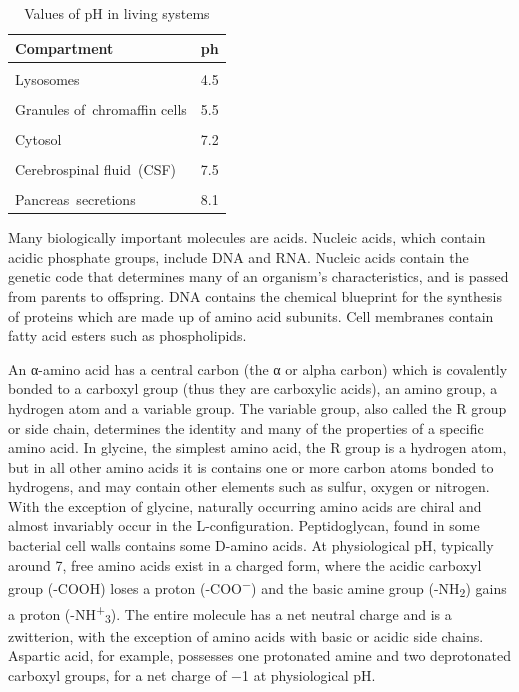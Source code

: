 \begin{table}[!h]

\caption{\label{tab:pH}Values of pH in living systems}
\centering
\begin{tabular}[t]{lc}
\toprule
Compartment & ph\\
\midrule
\cellcolor{gray!6}{Gastric acid} & \cellcolor{gray!6}{1.5-3.5}\\
Lysosomes & 4.5\\
\cellcolor{gray!6}{Human skin} & \cellcolor{gray!6}{4.7}\\
Granules of chromaffin cells & 5.5\\
\cellcolor{gray!6}{Urine} & \cellcolor{gray!6}{6}\\
\addlinespace
Cytosol & 7.2\\
\cellcolor{gray!6}{Blood (natural pH)} & \cellcolor{gray!6}{7.34–7.45}\\
Cerebrospinal fluid (CSF) & 7.5\\
\cellcolor{gray!6}{Mitochondrial matrix} & \cellcolor{gray!6}{7.5}\\
Pancreas secretions & 8.1\\
\bottomrule
\end{tabular}
\end{table}

Many biologically important molecules are acids. Nucleic acids, which contain acidic phosphate groups, include DNA and RNA. Nucleic acids contain the genetic code that determines many of an organism's characteristics, and is passed from parents to offspring. DNA contains the chemical blueprint for the synthesis of proteins which are made up of amino acid subunits. Cell membranes contain fatty acid esters such as phospholipids.

An α-amino acid has a central carbon (the α or alpha carbon) which is covalently bonded to a carboxyl group (thus they are carboxylic acids), an amino group, a hydrogen atom and a variable group. The variable group, also called the R group or side chain, determines the identity and many of the properties of a specific amino acid. In glycine, the simplest amino acid, the R group is a hydrogen atom, but in all other amino acids it is contains one or more carbon atoms bonded to hydrogens, and may contain other elements such as sulfur, oxygen or nitrogen. With the exception of glycine, naturally occurring amino acids are chiral and almost invariably occur in the L-configuration. Peptidoglycan, found in some bacterial cell walls contains some D-amino acids. At physiological pH, typically around 7, free amino acids exist in a charged form, where the acidic carboxyl group (-COOH) loses a proton (-COO\textsuperscript{−}) and the basic amine group (-NH\textsubscript{2}) gains a proton (-NH\textsuperscript{+}\textsubscript{3}). The entire molecule has a net neutral charge and is a zwitterion, with the exception of amino acids with basic or acidic side chains. Aspartic acid, for example, possesses one protonated amine and two deprotonated carboxyl groups, for a net charge of −1 at physiological pH.

